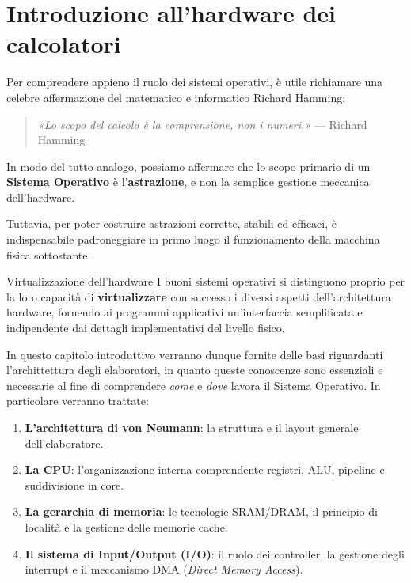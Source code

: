 \documentclass[12pt]{report}
\begin{document}
	
	
	\chapter{Introduzione all'hardware dei calcolatori}
	
	Per comprendere appieno il ruolo dei sistemi operativi, è utile richiamare una celebre affermazione del matematico e informatico Richard Hamming:
	
	\begin{quote}
		\textit{«Lo scopo del calcolo è la comprensione, non i numeri.»}
		\hfill --- Richard Hamming
	\end{quote}
	
	In modo del tutto analogo, possiamo affermare che lo scopo primario di un \textbf{Sistema Operativo} è l'\textbf{astrazione}, e non la semplice gestione meccanica dell'hardware. 
	
	Tuttavia, per poter costruire astrazioni corrette, stabili ed efficaci, è indispensabile padroneggiare in primo luogo il funzionamento della macchina fisica sottostante. 
	
	\begin{osservazione}{Virtualizzazione dell'hardware}{}
		I buoni sistemi operativi si distinguono proprio per la loro capacità di \textbf{virtualizzare} con successo i diversi aspetti dell'architettura hardware, fornendo ai programmi applicativi un'interfaccia semplificata e indipendente dai dettagli implementativi del livello fisico.
	\end{osservazione}
	
	In questo capitolo introduttivo verranno dunque fornite delle basi riguardanti l'archittettura degli elaboratori, in quanto queste conoscenze sono essenziali e necessarie al fine di comprendere \textit{come} e \textit{dove} lavora il Sistema Operativo.
	In particolare verranno trattate:
	
	\begin{enumerate}
		\item \textbf{L'architettura di von Neumann}: la struttura e il layout generale dell'elaboratore.
		\item \textbf{La CPU}: l'organizzazione interna comprendente registri, ALU, pipeline e suddivisione in core.
		\item \textbf{La gerarchia di memoria}: le tecnologie SRAM/DRAM, il principio di località e la gestione delle memorie cache.
		\item \textbf{Il sistema di Input/Output (I/O)}: il ruolo dei controller, la gestione degli interrupt e il meccanismo DMA (\textit{Direct Memory Access}).
	\end{enumerate}
	
\end{document}
